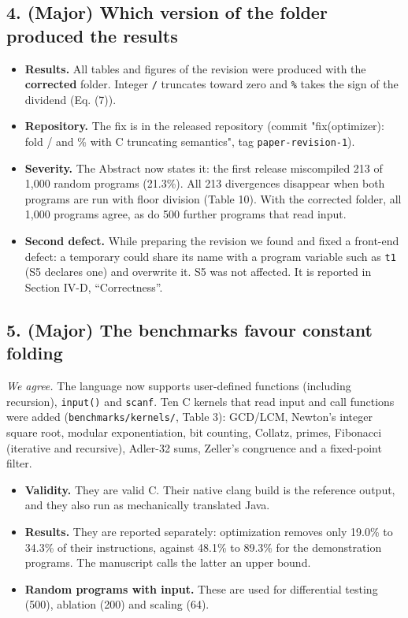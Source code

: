 \documentclass[11pt,a4paper]{article}
\begin{document}
\subsection*{4. (Major) Which version of the folder produced the results}
\begin{itemize}
\item \textbf{Results.} All tables and figures of the revision were produced with the \textbf{corrected} folder. Integer \texttt{/} truncates toward zero and \texttt{\%} takes the sign of the dividend (Eq. (7)).
\item \textbf{Repository.} The fix is in the released repository (commit "fix(optimizer): fold / and \% with C truncating semantics", tag \texttt{paper-revision-1}).
\item \textbf{Severity.} The Abstract now states it: the first release miscompiled 213 of 1,000 random programs (21.3\%). All 213 divergences disappear when both programs are run with floor division (Table 10). With the corrected folder, all 1,000 programs agree, as do 500 further programs that read input.
\item \textbf{Second defect.} While preparing the revision we found and fixed a front-end defect: a temporary could share its name with a program variable such as \texttt{t1} (S5 declares one) and overwrite it. S5 was not affected. It is reported in Section IV-D, ``Correctness''.
\end{itemize}
\subsection*{5. (Major) The benchmarks favour constant folding}
\emph{We agree.} The language now supports user-defined functions (including recursion), \texttt{input()} and \texttt{scanf}. Ten C kernels that read input and call functions were added (\texttt{benchmarks/kernels/}, Table 3): GCD/LCM, Newton's integer square root, modular exponentiation, bit counting, Collatz, primes, Fibonacci (iterative and recursive), Adler-32 sums, Zeller's congruence and a fixed-point filter.

\begin{itemize}
\item \textbf{Validity.} They are valid C. Their native clang build is the reference output, and they also run as mechanically translated Java.
\item \textbf{Results.} They are reported separately: optimization removes only 19.0\% to 34.3\% of their instructions, against 48.1\% to 89.3\% for the demonstration programs. The manuscript calls the latter an upper bound.
\item \textbf{Random programs with input.} These are used for differential testing (500), ablation (200) and scaling (64).
\end{itemize}
\end{document}
